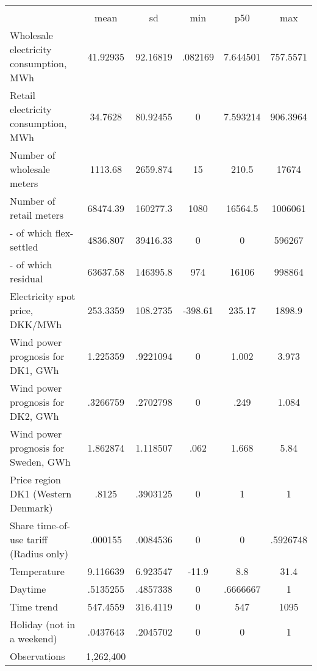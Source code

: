 \begin{tabular}{l*{1}{ccccc}}
\hline\hline
                    &\multicolumn{5}{c}{}                                            \\
                    &        mean&          sd&         min&         p50&         max\\
\midrule
Wholesale electricity consumption, MWh&    41.92935&    92.16819&     .082169&    7.644501&    757.5571\\
Retail electricity consumption, MWh&     34.7628&    80.92455&           0&    7.593214&    906.3964\\
Number of wholesale meters&     1113.68&    2659.874&          15&       210.5&       17674\\
Number of retail meters&    68474.39&    160277.3&        1080&     16564.5&     1006061\\
- of which flex-settled&    4836.807&    39416.33&           0&           0&      596267\\
- of which residual &    63637.58&    146395.8&         974&       16106&      998864\\
Electricity spot price, DKK/MWh&    253.3359&    108.2735&     -398.61&      235.17&      1898.9\\
Wind power prognosis for DK1, GWh&    1.225359&    .9221094&           0&       1.002&       3.973\\
Wind power prognosis for DK2, GWh&    .3266759&    .2702798&           0&        .249&       1.084\\
Wind power prognosis for Sweden, GWh&    1.862874&    1.118507&        .062&       1.668&        5.84\\
Price region DK1 (Western Denmark)&       .8125&    .3903125&           0&           1&           1\\
Share time-of-use tariff (Radius only)&     .000155&    .0084536&           0&           0&    .5926748\\
Temperature         &    9.116639&    6.923547&       -11.9&         8.8&        31.4\\
Daytime             &    .5135255&    .4857338&           0&    .6666667&           1\\
Time trend          &    547.4559&    316.4119&           0&         547&        1095\\
Holiday (not in a weekend)&    .0437643&    .2045702&           0&           0&           1\\
\midrule
Observations        &   1,262,400&            &            &            &            \\
\bottomrule\end{tabular}
